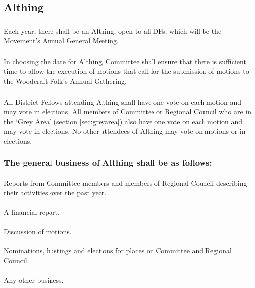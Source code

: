 \documentclass[a4paper, 12pt]{article}
\begin{document}
\subsection{Althing}
\label{sec:althing}
\subsubsection{}
Each year, there shall be an Althing, open to all DFs, which will be the Movement's Annual General Meeting.
\subsubsection{}
In choosing the date for Althing, Committee shall ensure that there is sufficient time to allow the execution of motions that call for the submission of motions to the Woodcraft Folk's Annual Gathering.
\subsubsection{}
All District Fellows attending Althing shall have one vote on each motion and may vote in elections. All members of Committee or Regional Council who are in the `Grey Area' (section \ref{sec:greyarea}) also have one vote on each motion and may vote in elections. No other attendees of Althing may vote on motions or in elections.
\subsubsection{The general business of Althing shall be as follows:}
\paragraph{}
Reports from Committee members and members of Regional Council describing their activities over the past year.
\paragraph{}
A financial report.
\paragraph{}
Discussion of motions.
\paragraph{}
Nominations, hustings and elections for places on Committee and Regional Council.
\paragraph{}
Any other business.
\end{document}

